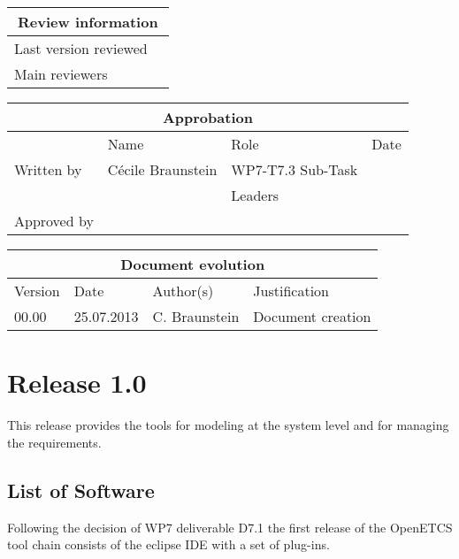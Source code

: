 \documentclass{openetcs_report}
\begin{document}
\begin{tabular}{|p{4.4cm}|p{8.7cm}|}
\hline
\multicolumn{2}{|c|}{Review information} \\
\hline
Last version reviewed &  \\
\hline
Main reviewers & \\
\hline
\end{tabular}

\begin{tabular}{|p{2.2cm}|p{4cm}|p{4cm}|p{2cm}|}
\hline
\multicolumn{4}{|c|}{Approbation} \\
\hline
  &  Name & Role & Date   \\
\hline  
Written by    &  Cécile Braunstein & WP7-T7.3 Sub-Task  & \\
&  & Leaders&\\
\hline
Approved by & &  & \\
\hline
\end{tabular}

\begin{tabular}{|p{2.2cm}|p{2cm}|p{3cm}|p{5cm}|}
\hline
\multicolumn{4}{|c|}{Document evolution} \\
\hline
Version &  Date & Author(s) & Justification  \\
\hline  
00.00 & 25.07.2013 & C. Braunstein  &  Document creation  \\
\hline  
\end{tabular}
\newpage


\mainmatter
\chapter{Release 1.0}

This release provides the tools for modeling at the system level and
for managing the requirements.


\section{List of Software}
Following the decision of WP7 deliverable D7.1 the first release of
the OpenETCS tool chain consists of the eclipse IDE with a set of plug-ins.
\end{document}
